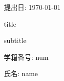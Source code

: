 \documentclass[dvipdfmx,a4j,11pt]{jsarticle}
\begin{document}
\begin{titlepage}
    \begin{center}

        {\Large 提出日: \today}

        

        \vspace{40truept}

        

        \vspace*{180truept}

        {\Huge  title} 
        \vspace{10truept}

            {\Huge subtitle}
        \vspace{160truept}


        {\Large 学籍番号: num}
        \vspace{10truept}

        \vspace{10truept}
        {\Large 氏名: name} 
        \vspace{10truept}

        {\Large }  

    \end{center}
\end{titlepage}
\newpage

\tableofcontents
\newpage

\end{document}
